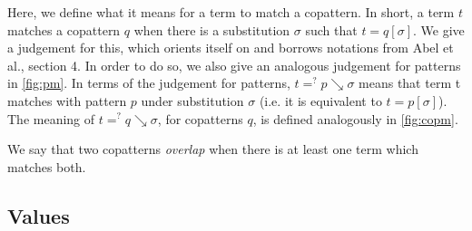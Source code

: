 Here, we define what it means for a term to match a copattern. In short, a term $t$ matches a copattern $q$ when there is a substitution $\sigma$ such that $t = q[\sigma]$. We give a judgement for this, which orients itself on and borrows notations from Abel et al.\cite{abel13copatterns}, section 4. In order to do so, we also give an analogous judgement for patterns in \autoref{fig:pm}. In terms of the judgement for patterns, $t =^? p \searrow \sigma$ means that term t matches with pattern $p$ under substitution $\sigma$ (i.e. it is equivalent to $t = p[\sigma]$). The meaning of $t =^? q \searrow \sigma$, for copatterns $q$, is defined analogously in \autoref{fig:copm}.

We say that two copatterns \textit{overlap} when there is at least one term which matches both. 

\subsection{Values}
\label{ssec:val}

